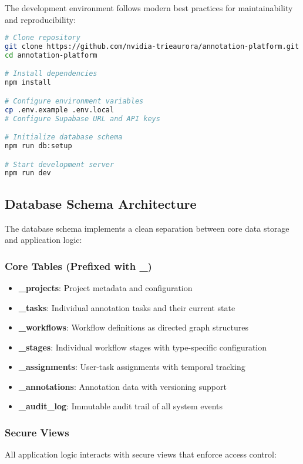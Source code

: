 The development environment follows modern best practices for maintainability and reproducibility:

\begin{lstlisting}[language=bash, caption=Development Environment Setup]
# Clone repository
git clone https://github.com/nvidia-trieaurora/annotation-platform.git
cd annotation-platform

# Install dependencies
npm install

# Configure environment variables
cp .env.example .env.local
# Configure Supabase URL and API keys

# Initialize database schema
npm run db:setup

# Start development server
npm run dev
\end{lstlisting}

\subsection{Database Schema Architecture}

The database schema implements a clean separation between core data storage and application logic:

\subsubsection{Core Tables (Prefixed with \_)}
\begin{itemize}
    \item \textbf{\_projects}: Project metadata and configuration
    \item \textbf{\_tasks}: Individual annotation tasks and their current state
    \item \textbf{\_workflows}: Workflow definitions as directed graph structures
    \item \textbf{\_stages}: Individual workflow stages with type-specific configuration
    \item \textbf{\_assignments}: User-task assignments with temporal tracking
    \item \textbf{\_annotations}: Annotation data with versioning support
    \item \textbf{\_audit\_log}: Immutable audit trail of all system events
\end{itemize}

\subsubsection{Secure Views}
All application logic interacts with secure views that enforce access control:

